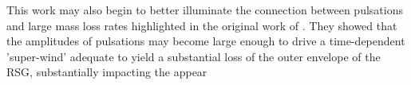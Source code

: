 This work may also begin to better illuminate the connection between
pulsations and large mass loss rates highlighted in the original work of \citet{Yoon_2010}. 
They showed that the amplitudes of pulsations may become large enough to drive a time-dependent
'super-wind' adequate to yield a substantial loss of the outer envelope of the RSG, substantially impacting the appear